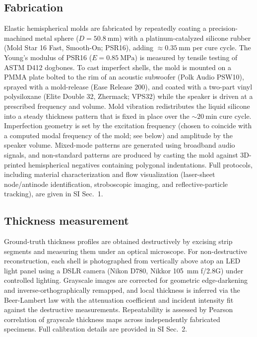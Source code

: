 \documentclass[twocolumn,letter,11pt]{article}
\begin{document}
\subsection*{Fabrication}
Elastic hemispherical molds are fabricated by repeatedly coating a precision-machined metal sphere ($D = \SI{50.8}{\milli\metre}$) with a platinum-catalyzed silicone rubber (Mold Star 16 Fast, Smooth-On; PSR16), adding $\approx \SI{0.35}{\milli\metre}$ per cure cycle. The Young's modulus of PSR16 ($E = \SI{0.85}{\mega\pascal}$) is measured by tensile testing of ASTM D412 dogbones. To cast imperfect shells, the mold is mounted on a PMMA plate bolted to the rim of an acoustic subwoofer (Polk Audio PSW10), sprayed with a mold-release (Ease Release 200), and coated with a two-part vinyl polysiloxane (Elite Double 32, Zhermack; VPS32) while the speaker is driven at a prescribed frequency and volume. Mold vibration redistributes the liquid silicone into a steady thickness pattern that is fixed in place over the $\sim \SI{20}{\minute}$ cure cycle. Imperfection geometry is set by the excitation frequency (chosen to coincide with a computed modal frequency of the mold; see below) and amplitude by the speaker volume. Mixed-mode patterns are generated using broadband audio signals, and non-standard patterns are produced by casting the mold against 3D-printed hemispherical negatives containing polygonal indentations. Full protocols, including material characterization and flow visualization (laser-sheet node/antinode identification, stroboscopic imaging, and reflective-particle tracking), are given in SI Sec.~1.

\subsection*{Thickness measurement}
Ground-truth thickness profiles are obtained destructively by excising strip segments and measuring them under an optical microscope. For non-destructive reconstruction, each shell is photographed from vertically above atop an LED light panel using a DSLR camera (Nikon D780, Nikkor \SI{105}{\milli\metre} f/2.8G) under controlled lighting. Grayscale images are corrected for geometric edge-darkening and inverse-orthographically remapped, and local thickness is inferred via the Beer-Lambert law with the attenuation coefficient and incident intensity fit against the destructive measurements. Repeatability is assessed by Pearson correlation of grayscale thickness maps across independently fabricated specimens. Full calibration details are provided in SI Sec.~2.
\end{document}
